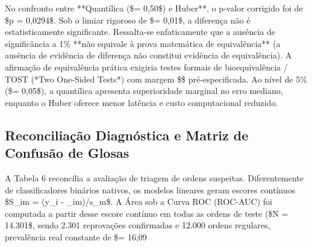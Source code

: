 \documentclass[12pt,a4paper]{article}
\begin{document}
No confronto entre **Quantílica (\$\tau = 0,50\$) e Huber**, o p-valor corrigido foi de \$p = 0,0294\$. Sob o limiar rigoroso de \$\alpha = 0,01\$, a diferença não é estatisticamente significante. Ressalta-se enfaticamente que a ausência de significância a 1\% **não equivale à prova matemática de equivalência** (a ausência de evidência de diferença não constitui evidência de equivalência). A afirmação de equivalência prática exigiria testes formais de bioequivalência / TOST (*Two One-Sided Tests*) com margem \$\Delta\$ pré-especificada. Ao nível de 5\% (\$\alpha = 0,05\$), a quantílica apresenta superioridade marginal no erro mediano, enquanto o Huber oferece menor latência e custo computacional reduzido.


\subsection{Reconciliação Diagnóstica e Matriz de Confusão de Glosas}

A Tabela 6 reconcilia a avaliação de triagem de ordens suspeitas. Diferentemente de classificadores binários nativos, os modelos lineares geram escores contínuos \$S\_{im} = (y\_i - \_{im})/s\_m\$. A Área sob a Curva ROC (ROC-AUC) foi computada a partir desse escore contínuo em todas as ordens de teste (\$N = 14.301\$, sendo 2.301 reprovações confirmadas e 12.000 ordens regulares, prevalência real constante de \$\pi = 16,09\\%
\end{document}
